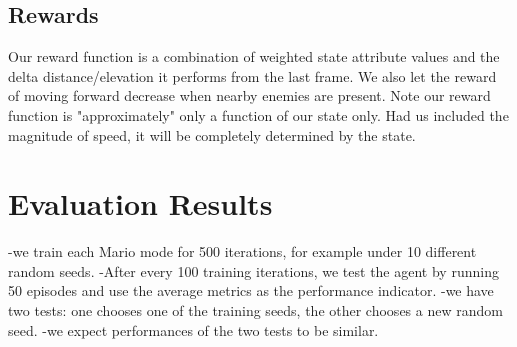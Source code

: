 \subsection{Rewards}
Our reward function is a combination of weighted state attribute values and the delta distance/elevation it performs from the last frame. We also let the reward of moving forward decrease when nearby enemies are present. Note our reward function is "approximately" only a function of our state only. Had us included the magnitude of speed, it will be completely determined by the state.

\section{Evaluation Results}
-we train each Mario mode for 500 iterations, for example under 10 different random seeds.
-After every 100 training iterations, we test the agent by running 50 episodes and use the average metrics as the performance indicator.
-we have two tests: one chooses one of the training seeds, the other chooses a new random seed.
-we expect performances of the two tests to be similar.






%
%

